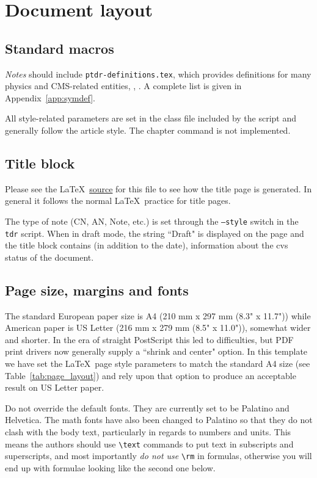 \section{Document layout}

\subsection{Standard macros}
\textit{Notes} should include
\texttt{ptdr-definitions.tex}, which provides definitions
for many physics and CMS-related entities, \eg, \GeVcc. A complete list is
given in Appendix~\ref{app:symdef}.

All style-related parameters are set in the
class file included by the script and generally follow the article style. The chapter command is not implemented.

\subsection{Title block}
Please see the \LaTeX\ \href{http://isscvs.cern.ch/cgi-bin/viewcvs-all.cgi/TDR/notes/example/example.tex?root=tdr&view=markup}{source} for this file to see how the title
page is generated. In general it follows the normal \LaTeX\ practice for title pages.

The type of note (CN, AN, Note, etc.) is set
through the \texttt{--style} switch in the \texttt{tdr} script. When in draft mode, the string ``Draft" is displayed on the page and the title block contains (in addition to the date), information about the cvs status of the document.

\subsection{Page size, margins and fonts}

The standard European  paper size is A4 (210 mm x 297 mm (8.3" x
11.7")) while American paper is US Letter (216 mm x 279 mm (8.5" x
11.0")), somewhat wider and shorter. In the era of straight
PostScript this led to difficulties, but PDF print drivers now
generally supply a  ``shrink and center" option. In this template
we have set the \LaTeX\ page style parameters to match the standard A4 size
(see Table~\ref{tab:page_layout}) and rely upon that option to
produce an acceptable result on US Letter paper.

Do not override the default fonts. They are currently set to be
Palatino and Helvetica. The math fonts have also been changed to
Palatino so that they do not clash with the body text,
particularly in regards to numbers and units. This means the
authors should use \verb|\text| commands to put text in subscripts
and superscripts, and most importantly \emph{do not use}
\verb|\rm| in formulas, otherwise you will end up with formulae looking like the second one below.

